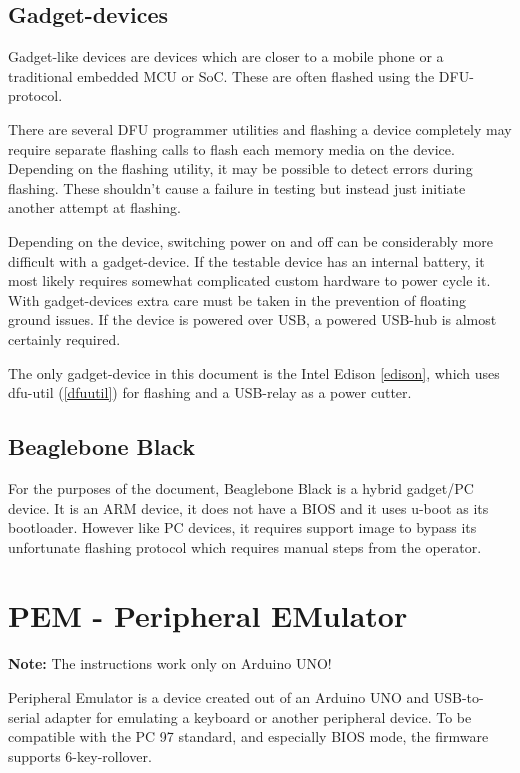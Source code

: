\documentclass[a4paper,11pt]{article}
\newcommand{\note}{\textbf{Note: }}
\begin{document}
\subsection{Gadget-devices}

Gadget-like devices are devices which are closer to a mobile phone or a traditional embedded MCU or SoC. These are often flashed using the DFU-protocol.

There are several DFU programmer utilities and flashing a device completely may require separate flashing calls to flash each memory media on the device. Depending on the flashing utility, it may be possible to detect errors during flashing. These shouldn't cause a failure in testing but instead just initiate another attempt at flashing.

Depending on the device, switching power on and off can be considerably more difficult with a gadget-device. If the testable device has an internal battery, it most likely requires somewhat complicated custom hardware to power cycle it. With gadget-devices extra care must be taken in the prevention of floating ground issues. If the device is powered over USB, a powered USB-hub is almost certainly required.

The only gadget-device in this document is the Intel Edison \ref{edison}, which uses dfu-util (\ref{dfuutil}) for flashing and a USB-relay as a power cutter.

\subsection{Beaglebone Black}
\label{bbb}

For the purposes of the document, Beaglebone Black is a hybrid gadget/PC device. It is an ARM device, it does not have a BIOS and it uses u-boot as its bootloader. However like PC devices, it requires support image to bypass its unfortunate flashing protocol which requires manual steps from the operator. 

\section{PEM - Peripheral EMulator}
\label{pem}

\note{The instructions work only on Arduino UNO!}

Peripheral Emulator is a device created out of an Arduino UNO and USB-to-serial adapter for emulating a keyboard or another peripheral device. To be compatible with the PC 97 standard, and especially BIOS mode, the firmware supports 6-key-rollover.
\end{document}
